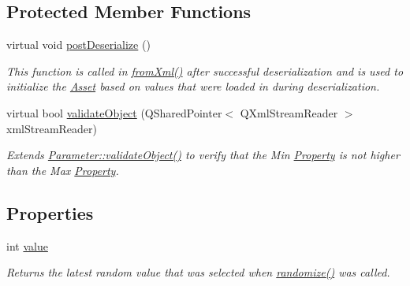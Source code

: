 \subsection*{Protected Member Functions}
\begin{DoxyCompactItemize}
\item 
virtual void \hyperlink{class_picto_1_1_random_int_parameter_a37e7252e426fae2a8d5f59c8385bd97a}{post\-Deserialize} ()
\begin{DoxyCompactList}\small\item\em This function is called in \hyperlink{class_picto_1_1_asset_a8bed4da09ecb1c07ce0dab313a9aba67}{from\-Xml()} after successful deserialization and is used to initialize the \hyperlink{class_picto_1_1_asset}{Asset} based on values that were loaded in during deserialization. \end{DoxyCompactList}\item 
\hypertarget{class_picto_1_1_random_int_parameter_afd2f01e2fafd298168812862b0718d65}{virtual bool \hyperlink{class_picto_1_1_random_int_parameter_afd2f01e2fafd298168812862b0718d65}{validate\-Object} (Q\-Shared\-Pointer$<$ Q\-Xml\-Stream\-Reader $>$ xml\-Stream\-Reader)}\label{class_picto_1_1_random_int_parameter_afd2f01e2fafd298168812862b0718d65}

\begin{DoxyCompactList}\small\item\em Extends \hyperlink{class_picto_1_1_parameter_a94c0e4191ffcc0bd642b647d24557082}{Parameter\-::validate\-Object()} to verify that the Min \hyperlink{class_picto_1_1_property}{Property} is not higher than the Max \hyperlink{class_picto_1_1_property}{Property}. \end{DoxyCompactList}\end{DoxyCompactItemize}
\subsection*{Properties}
\begin{DoxyCompactItemize}
\item 
int \hyperlink{class_picto_1_1_random_int_parameter_a59a557ac3a0881578fd4a60745cbb280}{value}
\begin{DoxyCompactList}\small\item\em Returns the latest random value that was selected when \hyperlink{class_picto_1_1_random_int_parameter_a2995dcbd9542ebeb1e880c573125a962}{randomize()} was called. \end{DoxyCompactList}\end{DoxyCompactItemize}
